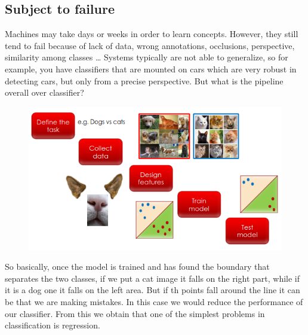 \subsection{Subject to failure}
Machines may take days or weeks in order to learn concepts. However, they still tend to fail because of lack of data, wrong annotations, occlusions, perspective, similarity among classes \dots
Systems typically are not able to generalize, so for example, you have classifiers that are mounted on cars which are very robust in detecting cars, but only from a precise perspective.
But what is the pipeline overall over classifier?
\begin{figure}[h]
    \centering
    \includegraphics[scale=0.6]{Figures/PipelineClassifier.png}
\end{figure}
So basically, once the model is trained and has found the boundary that separates the two classes, if we put a cat image it falls on the right part, while if it is a dog one it falls on the left area. But if th points fall around the line it can be that we are making mistakes.
In this case we would reduce the performance of our classifier. From this we obtain that one of the simplest problems in classification is regression.
